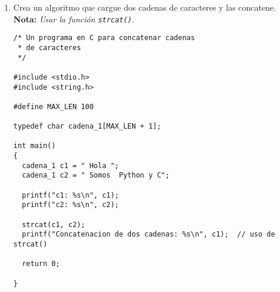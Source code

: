 \documentclass[twoside,10.5pt]{article}%
\begin{document}
\begin{enumerate}
\begin{verbatim}
/*
 * Un programa en C para calcular el metodo de 
 * Gauss-Jordan
*/

#include<stdio.h>
int main()
{
    int i,j,k,n;
    float A[20][20],c,x[10];
    printf("\nIngresa la dimension de la matriz : ");
    scanf("%d",&n);
    printf("\nIngresa los elementos de la matriz aumentada :\n");
    for(i=1; i<=n; i++)
    {
        for(j=1; j<=(n+1); j++)
        {
            printf(" A[%d][%d]:", i,j);
            scanf("%f",&A[i][j]);
        }
    }
    /* Ahora encontramos los elementos de la matriz diagonal  */
    for(j=1; j<=n; j++)
    {
        for(i=1; i<=n; i++)
        {
            if(i!=j)
            {
                c=A[i][j]/A[j][j];      // Como calcular el pivote
                for(k=1; k<=n+1; k++)
                {
                    A[i][k]=A[i][k]-c*A[j][k];
                }
            }
        }
    }
    printf("\nLa solucion es:\n");
    for(i=1; i<=n; i++)
    {
        x[i]=A[i][n+1]/A[i][i];
        printf("\n x%d=%f\n",i,x[i]);
    }
    return 0;
}
\end{verbatim}



\item Crea un algoritmo que cargue dos cadenas de caracteres y las concatene. \textbf{Nota:} \textit{Usar la funci\'on \texttt{strcat()}}.


\begin{verbatim}
/* Un programa en C para concatenar cadenas
 * de caracteres
 */

#include <stdio.h>
#include <string.h>

#define MAX_LEN 100

typedef char cadena_1[MAX_LEN + 1];

int main()
{
  cadena_1 c1 = " Hola ";
  cadena_1 c2 = " Somos  Python y C";
  
  printf("c1: %s\n", c1);
  printf("c2: %s\n", c2);
  
  strcat(c1, c2);
  printf("Concatenacion de dos cadenas: %s\n", c1);  // uso de strcat()
  
  return 0;
  
}
\end{verbatim}


\end{enumerate}
\end{document}
